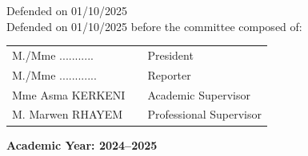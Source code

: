 \begin{titlepage}
\begin{center}
    Defended on  01/10/2025 \\

    \vspace{0.1cm}
    Defended on 01/10/2025 before the committee composed of:
    \end{center}
    \begin{tabular}{ p{5cm} p{3cm} p{5cm}}
      M./Mme  ........... & & President \\
      M./Mme  ............ & & Reporter \\
      Mme Asma KERKENI  & & Academic Supervisor \\
      M. Marwen RHAYEM & & Professional Supervisor \\
    \end{tabular}

    \vspace{0.3cm}
    \centering
    \textbf{Academic Year: 2024--2025}


\end{titlepage}
